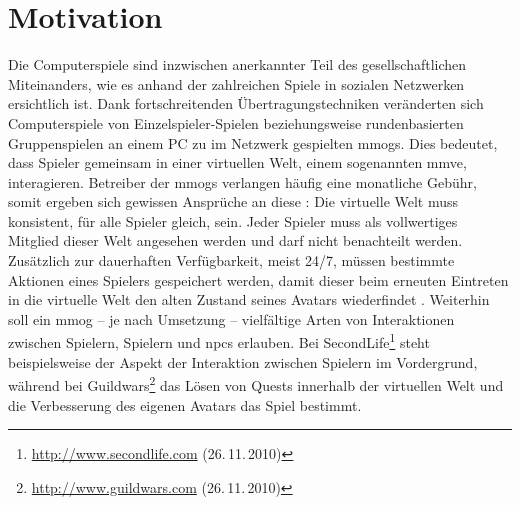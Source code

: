 \chapter{Motivation}
\label{chap:einleitung}
Die Computerspiele sind inzwischen anerkannter Teil des gesellschaftlichen Miteinanders, wie es anhand der zahlreichen Spiele in sozialen Netzwerken ersichtlich ist. Dank fortschreitenden Übertragungs\-techniken veränderten sich Computerspiele von Einzelspieler-Spielen beziehungsweise rundenbasierten Gruppenspielen an einem PC zu im Netzwerk gespielten \acp{mmog}. Dies bedeutet, dass Spieler gemeinsam in einer virtuellen Welt, einem sogenannten \ac{mmve}, interagieren. Betreiber der \acp{mmog} verlangen häufig eine monatliche Gebühr, somit ergeben sich gewissen Ansprüche an diese \cite{Fischer2010a}: Die virtuelle Welt muss konsistent, für alle Spieler gleich, sein. Jeder Spieler muss als vollwertiges Mitglied dieser Welt angesehen werden und darf nicht benachteilt werden. Zusätzlich zur dauerhaften Verfügbarkeit, meist 24/7, müssen bestimmte Aktionen eines Spielers gespeichert werden, damit dieser beim erneuten Eintreten in die virtuelle Welt den alten Zustand seines Avatars wiederfindet \cite{Zhang2008Persistence}. Weiterhin soll ein \ac{mmog} -- je nach Umsetzung -- vielfältige Arten von Interaktionen zwischen Spielern, Spielern und \acp{npc} erlauben. Bei SecondLife\footnote{\url{http://www.secondlife.com} (26.\,11.\,2010)} steht beispielsweise der Aspekt der Interaktion zwischen Spielern im Vordergrund, während bei Guildwars\footnote{\url{http://www.guildwars.com} (26.\,11.\,2010)} das Lösen von Quests innerhalb der virtuellen Welt und die Verbesserung des eigenen Avatars das Spiel bestimmt.

